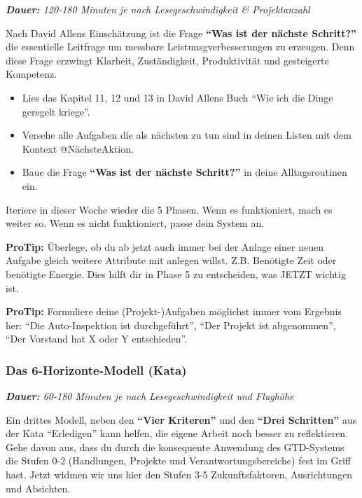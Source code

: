 \documentclass[
  ngerman,
  paper=a4,
,captions=tableheading
]{scrartcl}
\providecommand{\tightlist}{%
  \setlength{\itemsep}{0pt}\setlength{\parskip}{0pt}}
\begin{document}
\emph{\textbf{Dauer:} 120-180 Minuten je nach Lesegeschwindigkeit \&
Projektanzahl}

Nach David Allens Einschätzung ist die Frage \textbf{``Was ist der
nächste Schritt?''} die essentielle Leitfrage um messbare
Leistunsgverbesserungen zu erzeugen. Denn diese Frage erzwingt Klarheit,
Zuständigkeit, Produktivität und gesteigerte Kompetenz.

\begin{itemize}
\tightlist
\item
  Lies das Kapitel 11, 12 und 13 in David Allens Buch ``Wie ich die
  Dinge geregelt kriege''.
\item
  Versehe alle Aufgaben die als nächsten zu tun sind in deinen Listen
  mit dem Kontext @NächsteAktion.
\item
  Baue die Frage \textbf{``Was ist der nächste Schritt?''} in deine
  Alltagsroutinen ein.
\end{itemize}

Iteriere in dieser Woche wieder die 5 Phasen. Wenn es funktioniert, mach
es weiter so. Wenn es nicht funktioniert, passe dein System an.

\textbf{ProTip:} Überlege, ob du ab jetzt auch immer bei der Anlage
einer neuen Aufgabe gleich weitere Attribute mit anlegen willst. Z.B.
Benötigte Zeit oder benötigte Energie. Dies hilft dir in Phase 5 zu
entscheiden, was JETZT wichtig ist.

\textbf{ProTip:} Formuliere deine (Projekt-)Aufgaben möglichst immer vom
Ergebnis her: ``Die Auto-Inspektion ist durchgeführt'', ``Der Projekt
ist abgenommen'', ``Der Vorstand hat X oder Y entschieden''.

\hypertarget{das-6-horizonte-modell-kata}{%
\subsubsection{Das 6-Horizonte-Modell
(Kata)}\label{das-6-horizonte-modell-kata}}

\emph{\textbf{Dauer:} 60-180 Minuten je nach Lesegeschwindigkeit und
Flughöhe}

Ein drittes Modell, neben den \textbf{``Vier Kriteren''} und den
\textbf{``Drei Schritten''} aus der Kata ``Erledigen'' kann helfen, die
eigene Arbeit noch besser zu reflektieren. Gehe davon aus, dass du durch
die konsequente Anwendung des GTD-Systems die Stufen 0-2 (Handlungen,
Projekte und Verantwortungsbereiche) fest im Griff hast. Jetzt widmen
wir uns hier den Stufen 3-5 Zukunftsfaktoren, Ausrichtungen und
Absichten.
\end{document}
